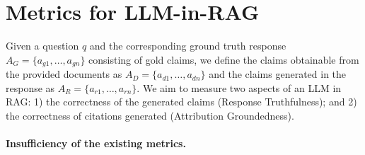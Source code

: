 \documentclass{article} %
\renewcommand{\cite}[1]{\citep{#1}}
\begin{document}




\section{Metrics for LLM-in-RAG}
Given a question \(q\) and the corresponding ground truth response \(A_G = \{a_{g1}, \ldots, a_{gn}\}\) consisting of gold claims, we define the claims obtainable from the provided documents as \(A_D = \{a_{d1}, \ldots, a_{dn}\}\) and the claims generated in the response as \(A_R = \{a_{r1}, \ldots, a_{rn}\}\). We aim to measure two aspects of an LLM in RAG: 1) the correctness of the generated claims (Response Truthfulness); and 2) the correctness of citations generated (Attribution Groundedness).

\paragraph{Insufficiency of the existing metrics.} 
\end{document}
